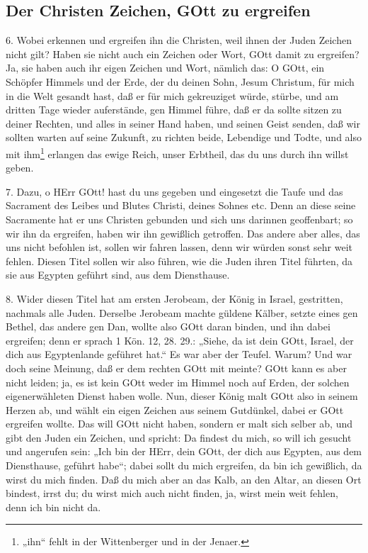 \subsection{Der Christen Zeichen, GOtt zu ergreifen}

6. Wobei erkennen und ergreifen ihn die Christen, weil ihnen der Juden Zeichen nicht gilt? Haben sie nicht auch ein Zeichen oder Wort, GOtt damit zu ergreifen? Ja, sie haben auch ihr eigen Zeichen und Wort, nämlich das: O GOtt, ein Schöpfer Himmels und der Erde, der du deinen Sohn, Jesum Christum, für mich in die Welt gesandt hast, daß er für mich gekreuziget würde, stürbe, und am dritten Tage wieder auferstände, gen Himmel führe, daß er da sollte sitzen zu deiner Rechten, und alles in seiner Hand haben, und seinen Geist senden, daß wir sollten warten auf seine Zukunft, zu richten beide, Lebendige und Todte, und also mit ihm\footnote{„ihn“ fehlt in der Wittenberger und in der Jenaer.} erlangen das ewige Reich, unser Erbtheil, das du uns durch ihn willst geben.

7. Dazu, o HErr GOtt! hast du uns gegeben und eingesetzt die Taufe und das Sacrament des Leibes und Blutes Christi, deines Sohnes etc. Denn an diese seine Sacramente hat er uns Christen gebunden und sich uns darinnen geoffenbart; so wir ihn da ergreifen, haben wir ihn gewißlich getroffen. Das andere aber alles, das uns nicht befohlen ist, sollen wir fahren lassen, denn wir würden sonst sehr weit fehlen. Diesen Titel sollen wir also führen, wie die Juden ihren Titel führten, da sie aus Egypten geführt sind, aus dem Diensthause.

8. Wider diesen Titel hat am ersten Jerobeam, der König in Israel, gestritten, nachmals alle Juden. Derselbe Jerobeam machte güldene Kälber, setzte eines gen Bethel, das andere gen Dan, wollte also GOtt daran binden, und ihn dabei ergreifen; denn er sprach 1 Kön. 12, 28. 29.: „Siehe, da ist dein GOtt, Israel, der dich aus Egyptenlande geführet hat.“ Es war aber der Teufel. Warum? Und war doch seine Meinung, daß er dem rechten GOtt mit meinte? GOtt kann es aber nicht leiden; ja, es ist kein GOtt weder im Himmel noch auf Erden, der solchen eigenerwähleten Dienst haben wolle. Nun, dieser König malt GOtt also in seinem Herzen ab, und wählt ein eigen Zeichen aus seinem Gutdünkel, dabei er GOtt ergreifen wollte. Das will GOtt nicht haben, sondern er malt sich selber ab, und gibt den Juden ein Zeichen, und spricht: Da findest du mich, so will ich gesucht und angerufen sein: „Ich bin der HErr, dein GOtt, der dich aus Egypten, aus dem Diensthause, geführt habe“; dabei sollt du mich ergreifen, da bin ich gewißlich, da wirst du mich finden. Daß du mich aber an das Kalb, an
den Altar, an diesen Ort bindest, irrst du; du wirst mich auch nicht finden, ja, wirst mein weit fehlen, denn ich bin nicht da.

